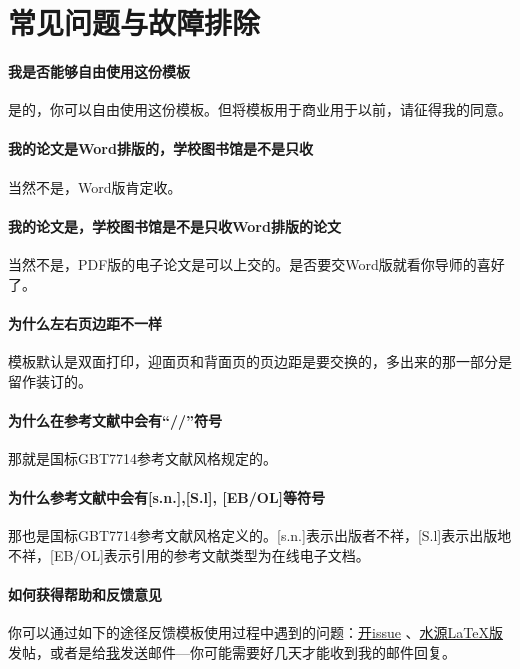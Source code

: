 
\chapter{常见问题与故障排除}
\label{chap:faq}

\subsubsection*{我是否能够自由使用这份模板}
是的，你可以自由使用这份模板。但将模板用于商业用于以前，请征得我的同意。

\subsubsection*{我的论文是Word排版的，学校图书馆是不是只收}
当然不是，Word版肯定收。

\subsubsection*{我的论文是，学校图书馆是不是只收Word排版的论文}
当然不是，PDF版的电子论文是可以上交的。是否要交Word版就看你导师的喜好了。

\subsubsection*{为什么左右页边距不一样}
模板默认是双面打印，迎面页和背面页的页边距是要交换的，多出来的那一部分是留作装订的。

\subsubsection*{为什么在参考文献中会有``//''符号}
那就是国标GBT7714参考文献风格规定的。

\subsubsection*{为什么参考文献中会有[s.n.],[S.l], [EB/OL]等符号}
那也是国标GBT7714参考文献风格定义的。[s.n.]表示出版者不祥，[S.l]表示出版地不祥，[EB/OL]表示引用的参考文献类型为在线电子文档。

\subsubsection*{如何获得帮助和反馈意见}
你可以通过如下的途径反馈模板使用过程中遇到的问题：\href{https://github.com/weijianwen/sjtu-thesis-template-latex/issues}{开issue}
、\href{https://bbs.sjtu.edu.cn/bbsdoc?board=TeX_LaTeX}{水源LaTeX版}发帖，或者是给\href{mailto:weijianwen@gmail.com}{我}发送邮件---你可能需要好几天才能收到我的邮件回复。

